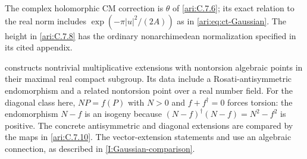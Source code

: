 \begin{remark}
\hypertarget{tag-IA14}{}\label{I:CM-compact-comparison}

The complex holomorphic CM correction is $\theta$ of
\cref{ari:C.7.6}; its exact relation to the real norm includes
$\exp(-\pi|u|^2/(2A))$ as in \eqref{ari:eq:ct-Gaussian}.
The height in \cref{ari:C.7.8} has the ordinary nonarchimedean
normalization specified in its cited appendix.

\citet[Theorem~2.1, p.~147]{bertrand1995} constructs nontrivial
multiplicative extensions with nontorsion algebraic points in
their maximal real compact subgroup. Its data include a
Rosati-antisymmetric endomorphism and a related nontorsion
point over a real number field.
For the diagonal class here, $NP=f(P)$ with $N>0$ and
$f+f^\dagger=0$ forces torsion: the endomorphism $N-f$ is an
isogeny because
$(N-f)^\dagger(N-f)=N^2-f^2$ is positive.
The concrete antisymmetric and diagonal extensions are
compared by the maps in \cref{ari:C.7.10}.
The vector-extension statements
\cite[Theorem~3.1, p.~150]{bertrand1995} and \cite[Theorem~3.1.2, p.~386]{bost2009}
use an algebraic connection, as described in
\cref{I:Gaussian-comparison}.
\end{remark}
